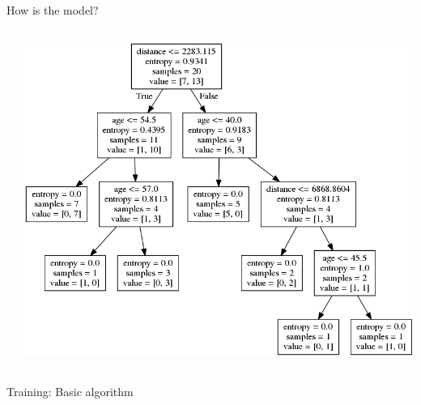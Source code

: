 \begin{frame}{How is the model?}
    \begin{columns}
     \begin{column}{.49\textwidth}
        
     \end{column}
    
     \begin{column}{.49\textwidth}
        \includegraphics[scale=.25]{images/tree}
     \end{column}
    \end{columns}
\end{frame}


\begin{frame}[fragile]{Training: Basic algorithm}
    
\end{frame}


